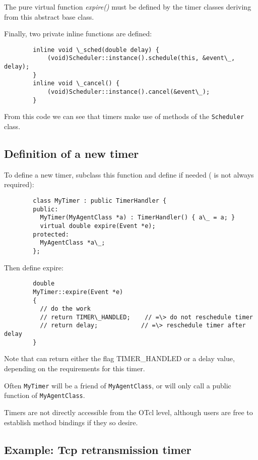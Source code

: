 The pure virtual function {\it expire()} must be defined by the timer classes deriving
from this abstract base class.

Finally, two private inline functions are defined:
\begin{verbatim}
        inline void \_sched(double delay) {
            (void)Scheduler::instance().schedule(this, &event\_, delay);
        }
        inline void \_cancel() {
            (void)Scheduler::instance().cancel(&event\_);
        }
\end{verbatim}

From this code we can see that timers make use of methods of the 
{\tt Scheduler} class.

\subsection{Definition of a new timer}
\label{sec:definition}

To define a new timer, subclass this function and
define  if needed
( is not always required):
\begin{verbatim}
        class MyTimer : public TimerHandler {
        public:
          MyTimer(MyAgentClass *a) : TimerHandler() { a\_ = a; }
          virtual double expire(Event *e);
        protected:
          MyAgentClass *a\_;
        };
\end{verbatim}
Then define expire:
\begin{verbatim}
        double
        MyTimer::expire(Event *e)
        {
          // do the work
          // return TIMER\_HANDLED;    // =\> do not reschedule timer
          // return delay;            // =\> reschedule timer after delay
        }
\end{verbatim}
Note that  can return either the flag TIMER\_HANDLED or a
delay value, depending on the requirements for this timer.

Often {\tt MyTimer} will be a friend of {\tt MyAgentClass}, or 
 will only call a public function of {\tt MyAgentClass}.

Timers are not directly accessible from the OTcl level, although users are
free to establish method bindings if they so desire.

\subsection{Example: Tcp retransmission timer}
\label{sec:timerexample}

